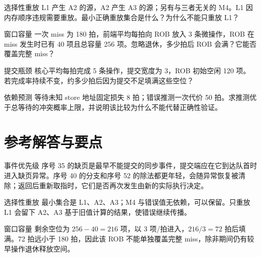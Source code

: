 \begin{chapterexercise}{选择性重放}
L1 产生 A2 的源，A2 产生 A3 的源；另有与三者无关的 M4。L1 因内存顺序违规需要重放。最小正确重放集合是什么？为什么不能只重放 L1？
\end{chapterexercise}

\begin{chapterexercise}{窗口容量}
一次 miss 为 180 拍，前端平均每拍向 ROB 放入 3 条微操作，ROB 在 miss 发生时已有 40 项且总容量 256 项。忽略退休，多少拍后 ROB 会满？它能否覆盖完整 miss？
\end{chapterexercise}

\begin{chapterexercise}{提交瓶颈}
核心平均每拍完成 5 条操作，提交宽度为 3，ROB 初始空闲 120 项。若完成率持续不变，约多少拍后因为提交不足填满这些空位？
\end{chapterexercise}

\begin{chapterexercise}{依赖预测}
等待未知 store 地址固定损失 8 拍；错误推测一次代价 50 拍。求推测优于总等待的冲突概率上限，并说明该比较为什么不能代替正确性验证。
\end{chapterexercise}

\section*{参考解答与要点}

\begin{chapteranswer}{事件优先级}
序号 35 的缺页是最早不能提交的同步事件，提交端应在它到达队首时进入缺页异常。序号 40 的分支和序号 52 的除法都更年轻，会随异常恢复被清除；返回后重新取指时，它们是否再次发生由新的实际执行决定。
\end{chapteranswer}

\begin{chapteranswer}{选择性重放}
最小集合是 L1、A2、A3；M4 与错误值无依赖，可以保留。只重放 L1 会留下 A2、A3 基于旧值计算的结果，使错误继续传播。
\end{chapteranswer}

\begin{chapteranswer}{窗口容量}
剩余空位为 $256-40=216$ 项，以 3 项/拍进入，$216/3=72$ 拍后填满。72 拍远小于 180 拍，因此该 ROB 不能单独覆盖完整 miss，除非期间仍有较早操作退休释放空间。
\end{chapteranswer}

